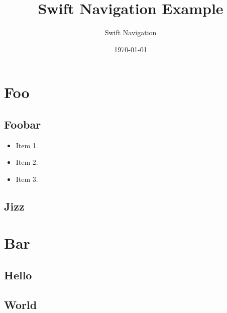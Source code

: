 \documentclass{article}
\title{Swift Navigation Example}
\author{Swift Navigation}
\date{\today}
\begin{document}
\maketitle




\begin{multicols}{2}

\tableofcontents

\section{Foo}
\subsection{Foobar}
\large
\label{sec:Features}
\begin{itemize}
  \bulletnoindent
  \item Item 1.
  \item Item 2.
  \item Item 3.
\end{itemize}
\normalsize

\subsection{Jizz}
\lipsum[1]

\section{Bar}
\subsection{Hello}
\lipsum[1]
\subsection{World}
\lipsum[2-7]

\end{multicols} 
\end{document}
